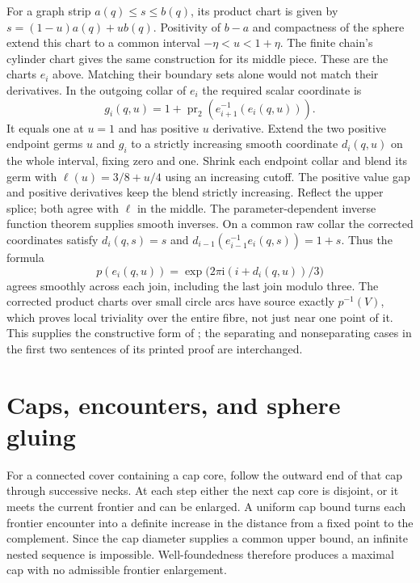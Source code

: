 For a graph strip $a(q)\le s\le b(q)$, its product chart is given by
$s=(1-u)a(q)+ub(q)$.  Positivity of $b-a$ and compactness of the
sphere extend this chart to a common interval $-\eta<u<1+\eta$.
The finite chain's cylinder chart gives the same construction for its
middle piece.  These are the charts $e_i$ above.  Matching their boundary
sets alone would not match their derivatives.  In the outgoing collar of
$e_i$ the required scalar coordinate is
\[
 g_i(q,u)=1+\operatorname{pr}_2(e_{i+1}^{-1}(e_i(q,u))).
\]
It equals one at $u=1$ and has positive $u$ derivative.  Extend the two
positive endpoint germs $u$ and $g_i$ to a strictly increasing smooth
coordinate $d_i(q,u)$ on the whole interval, fixing zero and one.
Shrink each endpoint collar and blend its germ with
$\ell(u)=3/8+u/4$ using an increasing cutoff.  The positive value gap
and positive derivatives keep the blend strictly increasing.  Reflect
the upper splice; both agree with $\ell$ in the middle.  The
parameter-dependent inverse function theorem supplies smooth inverses.
On a common raw collar the corrected coordinates satisfy
$d_i(q,s)=s$ and
$d_{i-1}(e_{i-1}^{-1}e_i(q,s))=1+s$.
Thus the formula
\[
 p(e_i(q,u))=\exp\bigl(2\pi\mathrm{i}(i+d_i(q,u))/3\bigr)
\]
agrees smoothly across each join, including the last join modulo three.
The corrected product charts over small circle arcs have source exactly
$p^{-1}(V)$, which proves local triviality over the entire fibre, not just
near one point of it.  This supplies the constructive form of
\cite[Lemma A.20, p.~508]{MT2007}; the separating and nonseparating cases
in the first two sentences of its printed proof are interchanged.

\section{Caps, encounters, and sphere gluing}
\label{sec:ball-gluing}

For a connected cover containing a cap core, follow the outward end of that cap
through successive necks.  At each step either the next cap core is disjoint,
or it meets the current frontier and can be enlarged.  A uniform cap bound
turns each frontier encounter into a definite increase in the distance from a
fixed point to the complement.  Since the cap diameter supplies a common upper
bound, an infinite nested sequence is impossible.  Well-foundedness therefore
produces a maximal cap with no admissible frontier enlargement.

